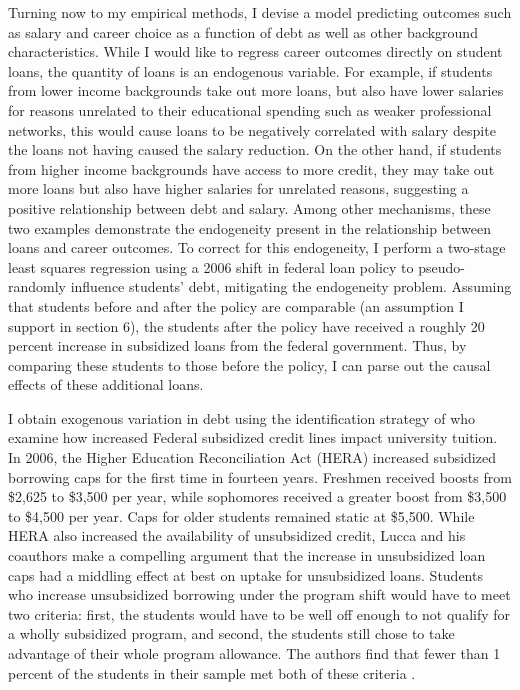 \documentclass[12pt]{article}
\begin{document}
	Turning now to my empirical methods, I devise a model predicting outcomes such as salary and career choice as a function of debt as well as other background characteristics. While I would like to regress career outcomes directly on student loans, the quantity of loans is an endogenous variable. For example, if students from lower income backgrounds take out more loans, but also have lower salaries for reasons unrelated to their educational spending such as weaker professional networks, this would cause loans to be negatively correlated with salary despite the loans not having caused the salary reduction. On the other hand, if students from higher income backgrounds have access to more credit, they may take out more loans but also have higher salaries for unrelated reasons, suggesting a positive relationship between debt and salary. Among other mechanisms, these two examples demonstrate the endogeneity present in the relationship between loans and career outcomes. To correct for this endogeneity, I perform a two-stage least squares regression using a 2006 shift in federal loan policy to pseudo-randomly influence students' debt, mitigating the endogeneity problem. Assuming that students before and after the policy are comparable (an assumption I support in section 6), the students after the policy have received a roughly 20 percent increase in subsidized loans from the federal government. Thus, by comparing these students to those before the policy, I can parse out the causal effects of these additional loans.
	
	I obtain exogenous variation in debt using the identification strategy of \textcite{lucca2018} who examine how increased Federal subsidized credit lines impact university tuition. In 2006, the Higher Education Reconciliation Act (HERA) increased subsidized borrowing caps for the first time in fourteen years. Freshmen received boosts from \$2,625 to \$3,500 per year, while sophomores received a greater boost from \$3,500 to \$4,500 per year. Caps for older students remained static at \$5,500. While HERA also increased the availability of unsubsidized credit, Lucca and his coauthors make a compelling argument that the increase in unsubsidized loan caps had a middling effect at best on uptake for unsubsidized loans. Students who increase unsubsidized borrowing under the program shift would have to meet two criteria: first, the students would have to be well off enough to not qualify for a wholly subsidized program, and second, the students still chose to take advantage of their whole program allowance. The authors find that fewer than 1 percent of the students in their sample met both of these criteria \parencite[p. 434]{lucca2018}.
	
\end{document}

